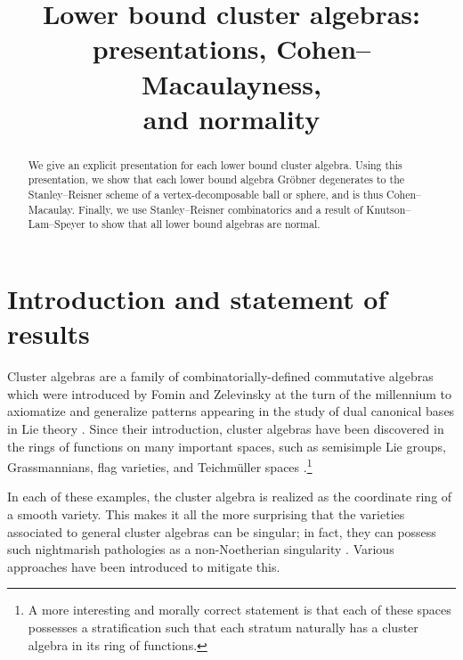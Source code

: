 \documentclass[ALCO,published]{cedram}
\title[Lower bound cluster algebras]{Lower bound cluster algebras:\\ presentations, Cohen--Macaulayness,\\ and normality}
\author{\firstname{Greg} \lastname{Muller}}
\author{\firstname{Jenna} \lastname{Rajchgot}}
\author{\firstname{Bradley} \lastname{Zykoski}}
\numberwithin{equation}{section}
\newcommand{\1}{^{-1}}
\begin{document}
\begin{abstract}
We give an explicit presentation for each lower bound cluster algebra. Using this presentation, we show that each  lower bound algebra Gr\"obner degenerates to the Stanley--Reisner scheme of a vertex-decomposable ball or sphere, and is thus Cohen--Macaulay. Finally, we use Stanley--Reisner combinatorics and a result of Knutson--Lam--Speyer to show that all lower bound algebras are normal.
\end{abstract}

\maketitle



\section{Introduction and statement of results}

Cluster algebras are a family of combinatorially-defined commutative algebras which were introduced by Fomin and Zelevinsky at the turn of the millennium to axiomatize and generalize patterns appearing in the study of dual canonical bases in Lie theory \cite{FZ02}.  Since their introduction, cluster algebras have been discovered in the rings of functions on many important spaces, such as semisimple Lie groups, Grassmannians, flag varieties, and Teichm\"uller spaces \cite{BFZ05,Sco06,GLS08,GSV05}.\footnote{A more interesting and morally correct statement is that each of these spaces possesses a stratification such that each stratum naturally has a cluster algebra in its ring of functions.}

In each of these examples, the cluster algebra is realized as the coordinate ring of a smooth variety.  This makes it all the more surprising that the varieties associated to general cluster algebras can be singular; in fact, they can possess such nightmarish pathologies as a non-Noetherian singularity \cite{MulLA}.  Various approaches have been introduced to mitigate this. %
\end{document}
